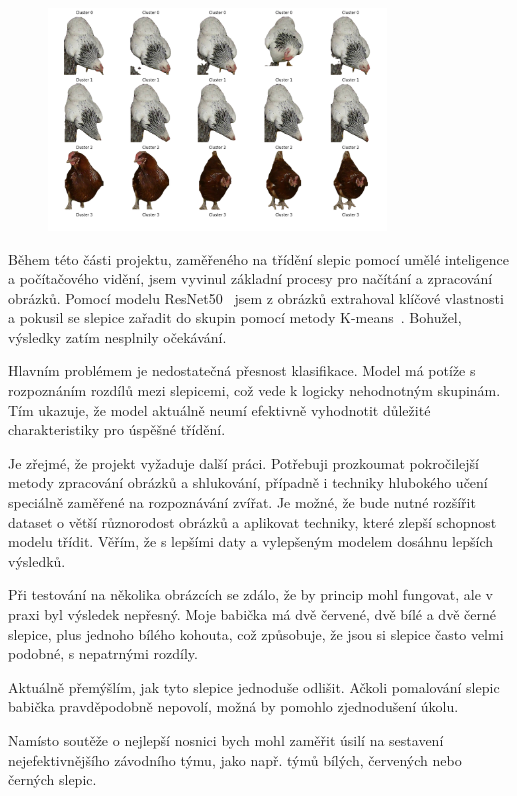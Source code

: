 \begin{figure}[H]
    \centering
    \includegraphics[width=0.8\textwidth]{img/chicks_in_clusters_2}
    \label{fig:chicks_in_clusters_2}
\end{figure}

Během této části projektu, zaměřeného na třídění slepic pomocí umělé inteligence a počítačového vidění, jsem vyvinul základní procesy pro načítání a zpracování obrázků.
Pomocí modelu ResNet50~\cite{ResNet50Documentation} jsem z obrázků extrahoval klíčové vlastnosti a pokusil se slepice zařadit do skupin pomocí metody K-means~\cite{scikit-learnKMeans}.
Bohužel, výsledky zatím nesplnily očekávání.

Hlavním problémem je nedostatečná přesnost klasifikace.
Model má potíže s rozpoznáním rozdílů mezi slepicemi, což vede k logicky nehodnotným skupinám.
Tím ukazuje, že model aktuálně neumí efektivně vyhodnotit důležité charakteristiky pro úspěšné třídění.

Je zřejmé, že projekt vyžaduje další práci.
Potřebuji prozkoumat pokročilejší metody zpracování obrázků a shlukování, případně i techniky hlubokého učení speciálně zaměřené na rozpoznávání zvířat.
Je možné, že bude nutné rozšířit dataset o větší různorodost obrázků a aplikovat techniky, které zlepší schopnost modelu třídit.
Věřím, že s lepšími daty a vylepšeným modelem dosáhnu lepších výsledků.

Při testování na několika obrázcích se zdálo, že by princip mohl fungovat, ale v praxi byl výsledek nepřesný.
Moje babička má dvě červené, dvě bílé a dvě černé slepice, plus jednoho bílého kohouta, což způsobuje, že jsou si slepice často velmi podobné, s nepatrnými rozdíly.

Aktuálně přemýšlím, jak tyto slepice jednoduše odlišit.
Ačkoli pomalování slepic babička pravděpodobně nepovolí, možná by pomohlo zjednodušení úkolu.

Namísto soutěže o nejlepší nosnici bych mohl zaměřit úsilí na sestavení nejefektivnějšího závodního týmu, jako např. týmů bílých, červených nebo černých slepic.





